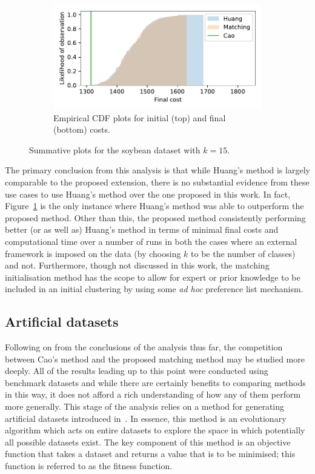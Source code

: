 \documentclass[smallextended]{svjour3}
\begin{document}
\begin{figure}
\begin{subfigure}{.5\textwidth}
        \includegraphics[width=\linewidth]{Fig8b2.pdf}
        \caption{Empirical CDF plots for initial (top) and final (bottom)
                 costs.}
    \end{subfigure}
    \caption{Summative plots for the soybean dataset with \(k=15\).}%
    \label{fig:soybean_nclasses}
\end{figure}

The primary conclusion from this analysis is that while Huang's method is
largely comparable to the proposed extension, there is no substantial evidence
from these use cases to use Huang's method over the one proposed in this work.
In fact, Figure~\ref{fig:soybean_nclasses} is the only instance where Huang's
method was able to outperform the proposed method. Other than this, the proposed
method consistently performing better (or as well as) Huang's method in terms of
minimal final costs and computational time over a number of runs in both the
cases where an external framework is imposed on the data (by choosing \(k\) to
be the number of classes) and not. Furthermore, though not discussed in this
work, the matching initialisation method has the scope to allow for expert or
prior knowledge to be included in an initial clustering by using some \textit{ad
hoc} preference list mechanism.


\subsection{Artificial datasets}\label{subsec:artificial}

Following on from the conclusions of the analysis thus far, the competition
between Cao's method and the proposed matching method may be studied more
deeply. All of the results leading up to this point were conducted using
benchmark datasets and while there are certainly benefits to comparing methods
in this way, it does not afford a rich understanding of how any of them perform
more generally. This stage of the analysis relies on a method for generating
artificial datasets introduced in~\cite{Wilde2019}. In essence, this method is
an evolutionary algorithm which acts on entire datasets to explore the space in
which potentially all possible datasets exist. The key component of this method
is an objective function that takes a dataset and returns a value that is to be
minimised; this function is referred to as the fitness function.
\end{document}
